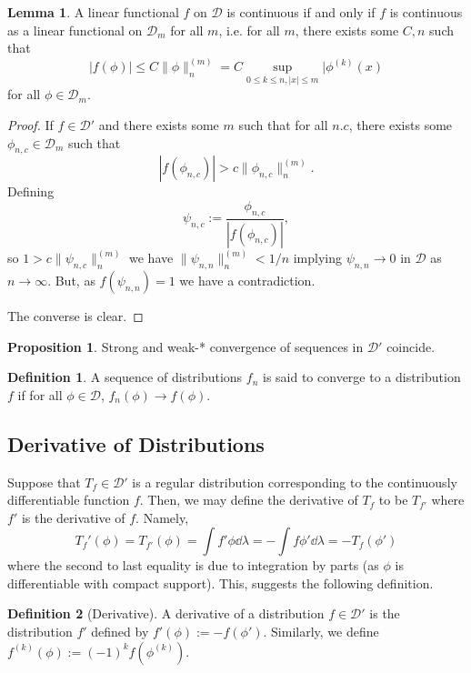 \documentclass[]{article}
\theoremstyle{definition}
\theoremstyle{definition}
\newtheorem{definition}{Definition}[section]
\newtheorem{lemma}{Lemma}[section]
\newtheorem{proposition}{Proposition}[section]
\begin{document}
\begin{lemma}
  A linear functional \(f\) on \(\mathcal{D}\) is continuous if and only if \(f\) 
  is continuous as a linear functional on \(\mathcal{D}_m\) for all \(m\), i.e. 
  for all \(m\), there exists some \(C, n\) such that 
  \[|f(\phi)| \le C\|\phi\|^{(m)}_n = C\sup_{0 \le k \le n, |x| \le m}|\phi^{(k)}(x)\]
  for all \(\phi \in \mathcal{D}_m\).
\end{lemma}
\begin{proof}
  If \(f \in \mathcal{D}'\) and there exists some \(m\) such that for all \(n. c\), 
  there exists some \(\phi_{n, c} \in \mathcal{D}_m\) such that 
  \[|f(\phi_{n, c})| > c\|\phi_{n, c}\|_n^{(m)}.\]
  Defining 
  \[\psi_{n, c} := \frac{\phi_{n, c}}{|f(\phi_{n, c})|},\]
  so \(1 > c \|\psi_{n, c}\|^{(m)}_n\) we have \(\|\psi_{n, n}\|_{n}^{(m)} < 1 / n\)
  implying \(\psi_{n, n} \to 0\) in \(\mathcal{D}\) as \(n \to \infty\). But, 
  as \(f(\psi_{n, n}) = 1\) we have a contradiction. 

  The converse is clear.
\end{proof}

\begin{proposition}
  Strong and weak-* convergence of sequences in \(\mathcal{D}'\) coincide. 
\end{proposition}

\begin{definition}
  A sequence of distributions \(f_n\) is said to converge to a distribution 
  \(f\) if for all \(\phi \in \mathcal{D}\), 
  \(f_n(\phi) \to f(\phi)\).
\end{definition}
 
\subsection{Derivative of Distributions}

Suppose that \(T_f \in \mathcal{D}'\) is a regular distribution corresponding 
to the continuously differentiable function \(f\). Then, we may define the 
derivative of \(T_f\) to be \(T_{f'}\) where \(f'\) is the derivative of \(f\).
Namely, 
\[T_f'(\phi) = T_{f'}(\phi) = \int f' \phi \dd \lambda = 
  -\int f \phi' \dd \lambda = - T_f(\phi')\]
where the second to last equality is due to integration by parts (as \(\phi\) is differentiable 
with compact support). This, suggests the following definition.

\begin{definition}[Derivative]
  A derivative of a distribution \(f \in \mathcal{D}'\) is the distribution \(f'\)
  defined by \(f'(\phi) := -f(\phi')\). Similarly, we define 
  \(f^{(k)}(\phi) := (-1)^k f(\phi^{(k)})\).
\end{definition}
\end{document}
